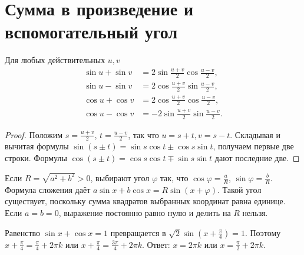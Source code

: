 \section{Сумма в произведение и вспомогательный угол}
\begin{theorem}
Для любых действительных \(u,v\)
\[
\begin{aligned}
\sin u+\sin v&=2\sin\frac{u+v}2\cos\frac{u-v}2,\\
\sin u-\sin v&=2\cos\frac{u+v}2\sin\frac{u-v}2,\\
\cos u+\cos v&=2\cos\frac{u+v}2\cos\frac{u-v}2,\\
\cos u-\cos v&=-2\sin\frac{u+v}2\sin\frac{u-v}2.
\end{aligned}
\]
\end{theorem}
\begin{proof}Положим \(s=\frac{u+v}2\), \(t=\frac{u-v}2\), так что \(u=s+t,v=s-t\). Складывая и вычитая формулы \(\sin(s\pm t)=\sin s\cos t\pm\cos s\sin t\), получаем первые две строки. Формулы \(\cos(s\pm t)=\cos s\cos t\mp\sin s\sin t\) дают последние две.\end{proof}
Если \(R=\sqrt{a^2+b^2}>0\), выбирают угол \(\varphi\) так, что \(\cos\varphi=\frac aR\), \(\sin\varphi=\frac bR\). Формула сложения даёт \(a\sin x+b\cos x=R\sin(x+\varphi)\). Такой угол существует, поскольку сумма квадратов выбранных координат равна единице. Если \(a=b=0\), выражение постоянно равно нулю и делить на \(R\) нельзя.
\begin{example}Равенство \(\sin x+\cos x=1\) превращается в \(\sqrt2\sin(x+\frac\pi4)=1\). Поэтому \(x+\frac\pi4=\frac\pi4+2\pi k\) или \(x+\frac\pi4=\frac{3\pi}4+2\pi k\). Ответ: \(x=2\pi k\) или \(x=\frac\pi2+2\pi k\).\end{example}

